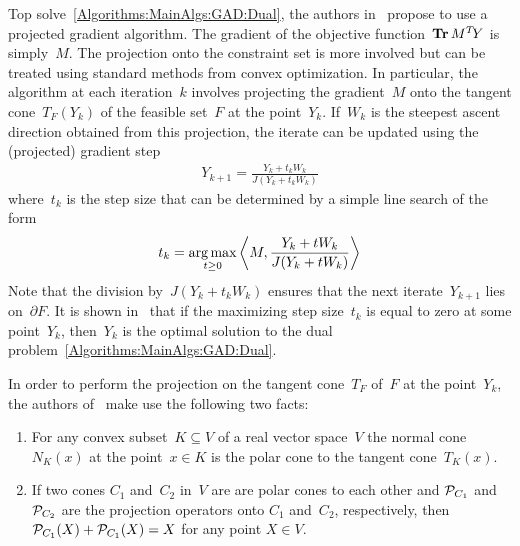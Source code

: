 \documentclass{../../common/projectreport}
\begin{document}
Top solve~\eqref{Algorithms:MainAlgs:GAD:Dual}, the authors in~\cite{Lin:2009kx} propose to use a projected gradient algorithm. The gradient of the objective function~$\operatorname{\mathbf{Tr}} M^T\!Y$ is simply~$M$. The projection onto the constraint set is more involved but can be treated using standard methods from convex optimization. In particular, the algorithm at each iteration~$k$ involves projecting the gradient~$M$ onto the tangent cone~$T_F(Y_k)$ of the feasible set~$F$ at the point~$Y_k$. If~$W_k$ is the steepest ascent direction obtained from this projection, the iterate can be updated using the (projected) gradient step
%
\begin{align}
Y_{k+1} = \frac{Y_k+t_kW_k}{J(Y_k+t_kW_k)}
\label{Algorithms:MainAlgs:GAD:GradStep}
\end{align}
%
where~$t_k$ is the step size that can be determined by a simple line search of the form
%
\begin{align}
t_k = \operatorname*{arg\,max}_{t\geq0} \left\langle M, \frac{Y_k+t W_k}{J(Y_k + t W_k)} \right\rangle
\label{Algorithms:MainAlgs:GAD:LineSearch}
\end{align}
%
Note that the division by~$J(Y_k+t_kW_k)$ ensures that the next iterate~$Y_{k+1}$ lies on~$\partial F$. It is shown in~\cite{Lin:2009kx} that if the maximizing step size~$t_k$ is equal to zero at some point~$Y_k$, then~$Y_k$ is the optimal solution to the dual problem~\eqref{Algorithms:MainAlgs:GAD:Dual}.


In order to perform the projection on the tangent cone~$T_F$ of~$F$ at the point~$Y_k$, the authors of~\cite{Lin:2009kx} make use the following two facts:
\begin{enumerate}
\item For any convex subset~$K \subseteq V$ of a real vector space~$V$ the normal cone~$N_K(x)$ at the point~$x\in K$ is the polar cone to the tangent cone~$T_K(x)$.
\item If two cones $C_1$ and~$C_2$ in~$V$ are are polar cones to each other and ${\mathcal{P}}_{C_1}$ and ${\mathcal{P}}_{C_2}$ are the projection operators onto $C_1$ and~$C_2$, respectively, then ${\mathcal{P}}_{C_1}(X)+ {\mathcal{P}}_{C_1}(X) = X $ for any point $X\in V$. 
\end{enumerate}
\end{document}
